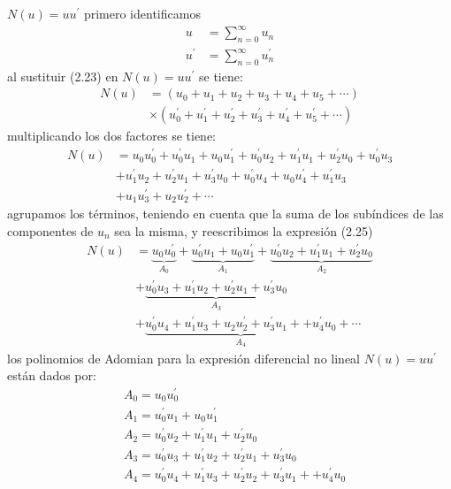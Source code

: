 \documentclass{amsart}
\begin{document}
$N(u)=u u^{\prime}$
primero identificamos
\begin{align*}
	u & =\sum_{n=0}^{\infty} u_n \\
	u^{\prime} & =\sum_{n=0}^{\infty} u_n^{\prime} \tag{2.23}
\end{align*}
al sustituir (2.23) en $N(u)=u u^{\prime}$ se tiene:
\begin{align*}
	N(u) & =\left(u_0+u_1+u_2+u_3+u_4+u_5+\cdots\right) \\
	& \times\left(u_0^{\prime}+u_1^{\prime}+u_2^{\prime}+u_3^{\prime}+u_4^{\prime}+u_5^{\prime}+\cdots\right) \tag{2.24}
\end{align*}
multiplicando los dos factores se tiene:
\begin{align*}
	N(u) & =u_0 u_0^{\prime}+u_0^{\prime} u_1+u_0 u_1^{\prime}+u_0^{\prime} u_2+u_1^{\prime} u_1+u_2^{\prime} u_0+u_0^{\prime} u_3 \\
	& +u_1^{\prime} u_2+u_2^{\prime} u_1+u_3^{\prime} u_0+u_0^{\prime} u_4+u_0 u_4^{\prime}+u_1^{\prime} u_3 \\
	& +u_1 u_3^{\prime}+u_2 u_2^{\prime}+\cdots \tag{2.25}
\end{align*}
agrupamos los términos, teniendo en cuenta que la suma de los subíndices de las componentes de $u_n$ sea la misma, y reescribimos la expresión (2.25)
\begin{align*}
	N(u) & =\underbrace{u_0 u_0^{\prime}}_{A_0}+\underbrace{u_0^{\prime} u_1+u_0 u_1^{\prime}}_{A_1}+\underbrace{u_0^{\prime} u_2+u_1^{\prime} u_1+u_2^{\prime} u_0}_{A_2} \\
	& +\underbrace{u_0^{\prime} u_3+u_1^{\prime} u_2+u_2^{\prime} u_1+u_3^{\prime} u_0}_{A_3} \\
	& +\underbrace{u_0^{\prime} u_4+u_1^{\prime} u_3+u_2 u_2^{\prime}+u_3^{\prime} u_1++u_4^{\prime} u_0}_{A_4}+\cdots \tag{2.26}
\end{align*}
los polinomios de Adomian para la expresión diferencial no lineal $N(u)=u u^{\prime}$ están dados por:
\begin{align*}
	& A_0=u_0 u_0^{\prime} \\
	& A_1=u_0^{\prime} u_1+u_0 u_1^{\prime} \\
	& A_2=u_0^{\prime} u_2+u_1^{\prime} u_1+u_2^{\prime} u_0 \\
	& A_3=u_0^{\prime} u_3+u_1^{\prime} u_2+u_2^{\prime} u_1+u_3^{\prime} u_0 \\
	& A_4=u_0^{\prime} u_4+u_1^{\prime} u_3+u_2^{\prime} u_2+u_3^{\prime} u_1++u_4^{\prime} u_0
\end{align*}
\end{document}
